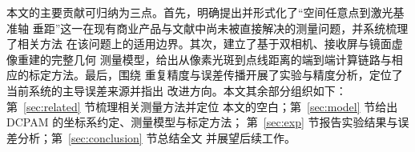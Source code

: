本文的主要贡献可归纳为三点。首先，明确提出并形式化了“空间任意点到激光基准轴
垂距”这一在现有商业产品与文献中尚未被直接解决的测量问题，并系统梳理了相关方法
在该问题上的适用边界。其次，建立了基于双相机、接收屏与镜面虚像重建的完整几何
测量模型，给出从像素光斑到点线距离的端到端计算链路与相应的标定方法。最后，围绕
重复精度与误差传播开展了实验与精度分析，定位了当前系统的主导误差来源并指出
改进方向。本文其余部分组织如下：第~\ref{sec:related} 节梳理相关测量方法并定位
本文的空白；第~\ref{sec:model} 节给出 DCPAM 的坐标系约定、测量模型与标定方法；
第~\ref{sec:exp} 节报告实验结果与误差分析；第~\ref{sec:conclusion} 节总结全文
并展望后续工作。
